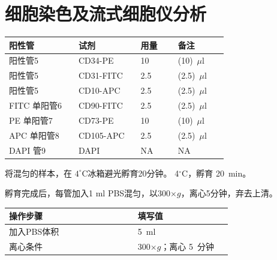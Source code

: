 \documentclass[UTF8,10pt,a4paper,fontset=fandol]{ctexart}
\newcommand{\fieldvalue}[1]{#1}
\newcommand{\handwritten}[1]{#1}
\begin{document}
\section*{细胞染色及流式细胞仪分析}

\begin{tabular}{|p{0.28\linewidth}|p{0.25\linewidth}|p{0.15\linewidth}|p{0.20\linewidth}|}
\hline
阳性管 & 试剂 & 用量 & 备注 \\
\hline
阳性管5 & CD34-PE &
\fieldvalue{\handwritten{10}} & (10)~$\mu$l \\
\hline
阳性管5 & CD31-FITC &
\fieldvalue{\handwritten{2.5}} & (2.5)~$\mu$l \\
\hline
阳性管5 & CD10-APC &
\fieldvalue{\handwritten{2.5}} & (2.5)~$\mu$l \\
\hline
FITC 单阳管6 & CD90-FITC &
\fieldvalue{\handwritten{2.5}} & (2.5)~$\mu$l \\
\hline
PE 单阳管7 & CD73-PE &
\fieldvalue{\handwritten{10}} & (10)~$\mu$l \\
\hline
APC 单阳管8 & CD105-APC &
\fieldvalue{\handwritten{2.5}} & (2.5)~$\mu$l \\
\hline
DAPI 管9 & DAPI & NA & NA \\
\hline
\end{tabular}

\medskip

将混匀的样本，在 $4^\circ$C冰箱避光孵育20分钟。
\fieldvalue{\handwritten{4}}$^\circ$C，孵育
\fieldvalue{\handwritten{20}}~min。

\medskip

孵育完成后，每管加入1 ml PBS混匀，以300$\times g$，离心5分钟，弃去上清。

\begin{tabular}{|p{0.52\linewidth}|p{0.38\linewidth}|}
\hline
操作步骤 & 填写值 \\
\hline
加入PBS体积 &
\fieldvalue{\handwritten{5}}~ml \\
\hline
离心条件 &
\fieldvalue{\handwritten{300}}$\times g$；离心
\fieldvalue{\handwritten{5}}~分钟 \\
\hline
\end{tabular}
\end{document}
